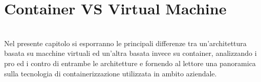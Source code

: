 
\chapter{Container VS Virtual Machine}
\label{cap:container-vm}

\\
Nel presente capitolo si esporranno le principali differenze tra un'architettura basata su macchine virtuali ed un'altra basata invece su container, analizzando i pro ed i contro di entrambe le architetture e fornendo al lettore una panoramica sulla tecnologia di containerizzazione utilizzata in ambito aziendale.


